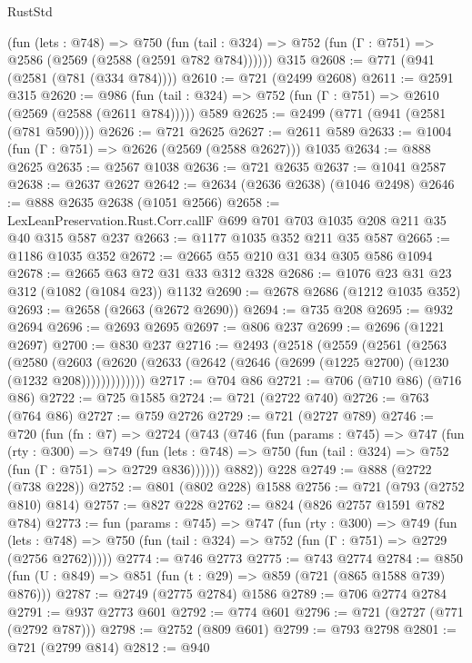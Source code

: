 \begin{lexlean}{RustStd}
\begin{coremodule}
{\begin{coremodule}
{{{{{{{{{{    (fun (lets : @748) =>
    @750 (fun (tail : @324) => @752 (fun (Γ : @751) => @2586 (@2569 (@2588 (@2591 @782 @784))))))
    @315
@2608 := @771 (@941 (@2581 (@781 (@334 @784))))
@2610 := @721 (@2499 @2608)
@2611 := @2591 @315
@2620 := @986
    (fun (tail : @324) => @752 (fun (Γ : @751) => @2610 (@2569 (@2588 (@2611 @784)))))
    @589
@2625 := @2499 (@771 (@941 (@2581 (@781 @590))))
@2626 := @721 @2625
@2627 := @2611 @589
@2633 := @1004 (fun (Γ : @751) => @2626 (@2569 (@2588 @2627))) @1035
@2634 := @888 @2625
@2635 := @2567 @1038
@2636 := @721 @2635
@2637 := @1041 @2587
@2638 := @2637 @2627
@2642 := @2634 (@2636 @2638) (@1046 @2498)
@2646 := @888 @2635 @2638 (@1051 @2566)
@2658 := LexLeanPreservation.Rust.Corr.callF @699 @701 @703 @1035 @208 @211 @35 @40 @315 @587 @237
@2663 := @1177 @1035 @352 @211 @35 @587
@2665 := @1186 @1035 @352
@2672 := @2665 @55 @210 @31 @34 @305 @586 @1094
@2678 := @2665 @63 @72 @31 @33 @312 @328
@2686 := @1076 @23 @31 @23 @312 (@1082 (@1084 @23)) @1132
@2690 := @2678 @2686 (@1212 @1035 @352)
@2693 := @2658 (@2663 (@2672 @2690))
@2694 := @735 @208
@2695 := @932 @2694
@2696 := @2693 @2695
@2697 := @806 @237
@2699 := @2696 (@1221 @2697)
@2700 := @830 @237
@2716 := @2493
    (@2518
      (@2559
        (@2561
          (@2563
            (@2580
              (@2603
                (@2620 (@2633 (@2642 (@2646 (@2699 (@1225 @2700) (@1230 (@1232 @208)))))))))))))
@2717 := @704 @86
@2721 := @706 (@710 @86) (@716 @86)
@2722 := @725 @1585
@2724 := @721 (@2722 @740)
@2726 := @763 (@764 @86)
@2727 := @759 @2726
@2729 := @721 (@2727 @789)
@2746 := @720
    (fun (fn : @7) =>
    @2724
      (@743
        (@746
          (fun (params : @745) =>
          @747
            (fun (rty : @300) =>
            @749
              (fun (lets : @748) =>
              @750 (fun (tail : @324) => @752 (fun (Γ : @751) => @2729 @836))))))
        @882))
    @228
@2749 := @888 (@2722 (@738 @228))
@2752 := @801 (@802 @228) @1588
@2756 := @721 (@793 (@2752 @810) @814)
@2757 := @827 @228
@2762 := @824 (@826 @2757 @1591 @782 @784)
@2773 := fun (params : @745) =>
  @747
    (fun (rty : @300) =>
    @749
      (fun (lets : @748) =>
      @750 (fun (tail : @324) => @752 (fun (Γ : @751) => @2729 (@2756 @2762)))))
@2774 := @746 @2773
@2775 := @743 @2774
@2784 := @850 (fun (U : @849) => @851 (fun (t : @29) => @859 (@721 (@865 @1588 @739) @876)))
@2787 := @2749 (@2775 @2784) @1586
@2789 := @706 @2774 @2784
@2791 := @937 @2773 @601
@2792 := @774 @601
@2796 := @721 (@2727 (@771 (@2792 @787)))
@2798 := @2752 (@809 @601)
@2799 := @793 @2798
@2801 := @721 (@2799 @814)
@2812 := @940
}}}}}}}}}}
\end{coremodule}}
\end{coremodule}
\end{lexlean}
